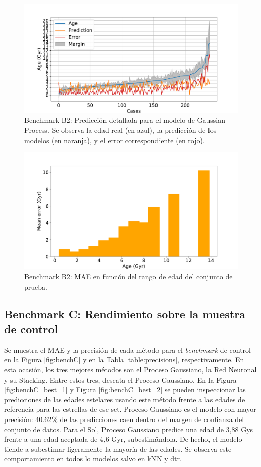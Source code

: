 \begin{figure}[H]
\begin{center}
 \includegraphics[width=0.8\linewidth]{Figuras/Experimentos/B_B2_gp_2.pdf}
\end{center}
\caption{Benchmark B2: Predicción detallada para el modelo de Gaussian Process. Se observa la edad real (en azul), la predicción de los modelos (en naranja), y el error correspondiente (en rojo).}
 \label{fig:benchB2_details_gp_2}
\end{figure}

\begin{figure}[H]
\begin{center}
 \includegraphics[width=0.8\linewidth]{Figuras/Experimentos/B_B2_gp_3.pdf}
\end{center}
\caption{Benchmark B2: MAE en función del rango de edad del conjunto de prueba.}
 \label{fig:benchB2_details_gp_3}
\end{figure}


\subsection{Benchmark C: Rendimiento sobre la muestra de control}

Se muestra el MAE y la precisión de cada método para el \emph{benchmark} de control en la Figura \ref{fig:benchC} y en la Tabla \ref{table:precisions}, respectivamente. En esta ocasión, los tres mejores métodos son el Proceso Gaussiano, la Red Neuronal y su Stacking. Entre estos tres, descata el Proceso Gaussiano. En la Figura \ref{fig:benchC_best_1} y Figura \ref{fig:benchC_best_2} se pueden inspeccionar las predicciones de las edades estelares usando este método frente a las edades de referencia para las estrellas de ese set. Proceso Gaussiano es el modelo con mayor precisión: $40.62\%$ de las predicciones caen dentro del margen de confianza del conjunto de datos. Para el Sol, Proceso Gaussiano predice una edad de 3,88 Gys frente a una edad aceptada de 4,6 Gyr, subestimándola. De hecho, el modelo tiende a subestimar ligeramente la mayoría de las edades. Se observa este comportamiento en todos lo modelos salvo en kNN y dtr. 

